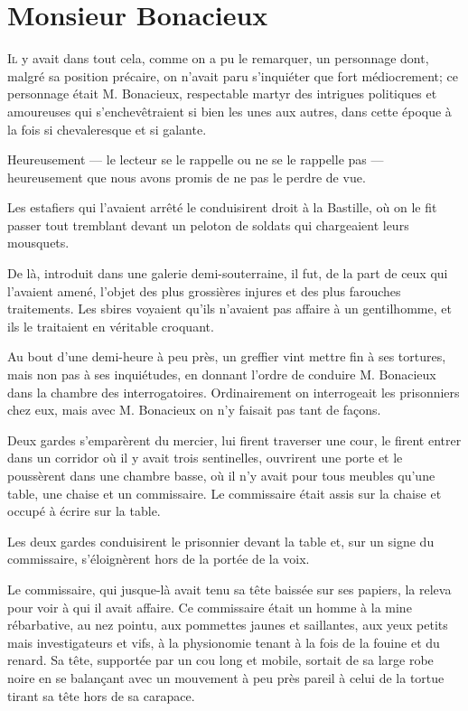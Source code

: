 
\chapter{Monsieur Bonacieux}
	
	\lettrine{I}{l} y avait dans tout cela, comme on a pu le remarquer, un personnage dont, malgré sa position précaire, on n'avait paru s'inquiéter que fort médiocrement; ce personnage était M. Bonacieux, respectable martyr des intrigues politiques et amoureuses qui s'enchevêtraient si bien les unes aux autres, dans cette époque à la fois si chevaleresque et si galante. 

Heureusement --- le lecteur se le rappelle ou ne se le rappelle pas --- heureusement que nous avons promis de ne pas le perdre de vue. 

Les estafiers qui l'avaient arrêté le conduisirent droit à la Bastille, où on le fit passer tout tremblant devant un peloton de soldats qui chargeaient leurs mousquets. 

De là, introduit dans une galerie demi-souterraine, il fut, de la part de ceux qui l'avaient amené, l'objet des plus grossières injures et des plus farouches traitements. Les sbires voyaient qu'ils n'avaient pas affaire à un gentilhomme, et ils le traitaient en véritable croquant. 

Au bout d'une demi-heure à peu près, un greffier vint mettre fin à ses tortures, mais non pas à ses inquiétudes, en donnant l'ordre de conduire M. Bonacieux dans la chambre des interrogatoires. Ordinairement on interrogeait les prisonniers chez eux, mais avec M. Bonacieux on n'y faisait pas tant de façons. 

Deux gardes s'emparèrent du mercier, lui firent traverser une cour, le firent entrer dans un corridor où il y avait trois sentinelles, ouvrirent une porte et le poussèrent dans une chambre basse, où il n'y avait pour tous meubles qu'une table, une chaise et un commissaire. Le commissaire était assis sur la chaise et occupé à écrire sur la table. 

Les deux gardes conduisirent le prisonnier devant la table et, sur un signe du commissaire, s'éloignèrent hors de la portée de la voix. 

Le commissaire, qui jusque-là avait tenu sa tête baissée sur ses papiers, la releva pour voir à qui il avait affaire. Ce commissaire était un homme à la mine rébarbative, au nez pointu, aux pommettes jaunes et saillantes, aux yeux petits mais investigateurs et vifs, à la physionomie tenant à la fois de la fouine et du renard. Sa tête, supportée par un cou long et mobile, sortait de sa large robe noire en se balançant avec un mouvement à peu près pareil à celui de la tortue tirant sa tête hors de sa carapace. 

